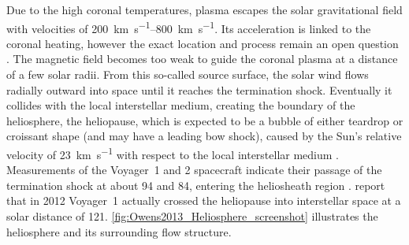 Due to the high coronal temperatures, plasma escapes the solar gravitational field \citep{Parker1958} with velocities of \SIrange{200}{800}{\km\per\s}. Its acceleration is linked to the coronal heating, however the exact location and process remain an open question \citep{Fox2015}. The magnetic field becomes too weak to guide the coronal plasma at a distance of a few solar radii. From this so-called source surface, the solar wind flows radially outward into space until it reaches the termination shock. Eventually it collides with the local interstellar medium, creating the boundary of the heliosphere, the heliopause, which is expected to be a bubble of either teardrop or croissant shape (and may have a leading bow shock), caused by the Sun's relative velocity of \SI{23}{\km\per\s} with respect to the local interstellar medium \citep{Owens2013, Opher2015}. Measurements of the Voyager~1 and 2 spacecraft indicate their passage of the termination shock at about \SI{94}{\au} and \SI{84}{\au}, entering the heliosheath region \citep{Owens2013}. \citet{Gurnett2013} report that in 2012 Voyager~1 actually crossed the heliopause into interstellar space at a solar distance of \SI{121}{\au}. \autoref{fig:Owens2013_Heliosphere_screenshot} illustrates the heliosphere and its surrounding flow structure.
\begin{figure}[htb]
\end{figure}

